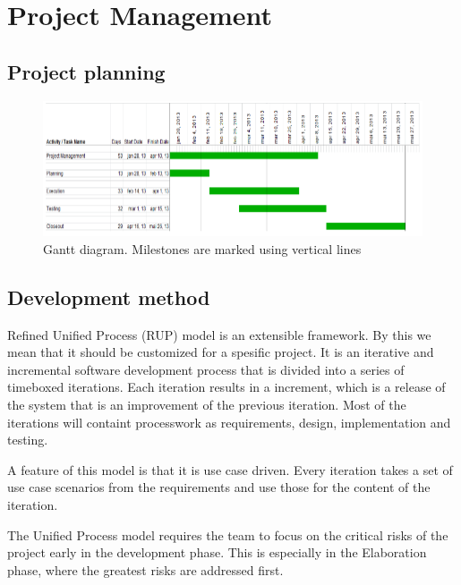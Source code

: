 \chapter{Project Management}

\section{Project planning}
\begin{figure}[H]
\includegraphics[scale=0.8]{images/gantt-diagram.png}
\caption{Gantt diagram. Milestones are marked using vertical lines}
\end{figure}

\section{Development method}

Refined Unified Process (RUP) model is an extensible framework. By this we mean that it should be customized for a spesific project.
It is an iterative and incremental software development process that is divided into a series of timeboxed iterations.
Each iteration results in a increment, which is a release of the system that is an improvement of the previous iteration.
Most of the iterations will containt processwork as requirements, design, implementation and testing.

A feature of this model is that it is use case driven. Every iteration takes a set of use case scenarios from the requirements and use those for the content of the iteration.

The Unified Process model requires the team to focus on the critical risks of the project early in the development phase. This is especially in the Elaboration phase, where the greatest risks are addressed first.

